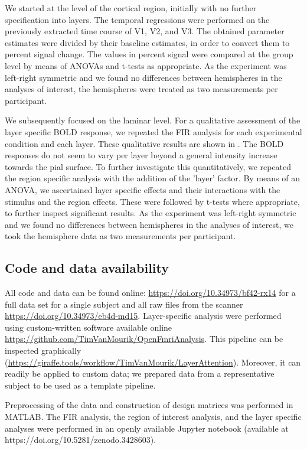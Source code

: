 \documentclass[9pt,lineno]{aperture}
\begin{document}
We started at the level of the cortical region, initially with no further specification into layers. The temporal regressions were performed on the previously extracted time course of V1, V2, and V3. The obtained parameter estimates were divided by their baseline estimates, in order to convert them to percent signal change. The values in percent signal were compared at the group level by means of ANOVAs and t-tests as appropriate. As the experiment was left-right symmetric and we found no differences between hemispheres in the analyses of interest, the hemispheres were treated as two measurements per participant.

We subsequently focused on the laminar level. For a qualitative assessment of the layer specific BOLD response, we repeated the FIR analysis for each experimental condition and each layer. These qualitative results are shown in . The BOLD responses do not seem to vary per layer beyond a general intensity increase towards the pial surface. To further investigate this quantitatively, we repeated the region specific analysis with the addition of the 'layer’ factor. By means of an ANOVA, we ascertained layer specific effects and their interactions with the stimulus and the region effects. These were followed by t-tests where appropriate, to further inspect significant results. As the experiment was left-right symmetric and we found no differences between hemispheres in the analyses of interest, we took the hemisphere data as two measurements per participant.

\subsection{Code and data availability}
All code and data can be found online: \url{https://doi.org/10.34973/bf42-rx14} for a full data set for a single subject and all raw files from the scanner \url{https://doi.org/10.34973/eb4d-md15}. Layer-specific analysis were performed using custom-written software available online \url{https://github.com/TimVanMourik/OpenFmriAnalysis}. This pipeline can be inspected graphically \citep{VanMourik2018} (\url{https://giraffe.tools/workflow/TimVanMourik/LayerAttention}). Moreover, it can readily be applied to custom data; we prepared data from a representative subject to be used as a template pipeline. 

Preprocessing of the data and construction of design matrices was performed in MATLAB. The FIR analysis, the region of interest analysis, and the layer specific analyses were performed in an openly available Jupyter notebook (available at https://doi.org/10.5281/zenodo.3428603).
\end{document}
